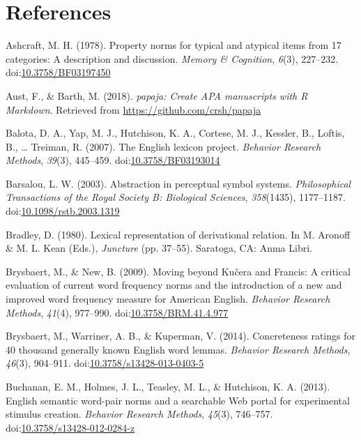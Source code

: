 \documentclass[english,,man]{apa6}
\theoremstyle{definition}
\theoremstyle{definition}
\theoremstyle{definition}
\theoremstyle{remark}
\begin{document}
\newpage

\section{References}\label{references}

\setlength{\parindent}{-0.5in} \setlength{\leftskip}{0.5in}

\hypertarget{refs}{}
\hypertarget{ref-Ashcraft1978a}{}
Ashcraft, M. H. (1978). Property norms for typical and atypical items
from 17 categories: A description and discussion. \emph{Memory \&
Cognition}, \emph{6}(3), 227--232.
doi:\href{https://doi.org/10.3758/BF03197450}{10.3758/BF03197450}

\hypertarget{ref-R-papaja}{}
Aust, F., \& Barth, M. (2018). \emph{papaja: Create APA manuscripts with
R Markdown}. Retrieved from \url{https://github.com/crsh/papaja}

\hypertarget{ref-Balota2007}{}
Balota, D. A., Yap, M. J., Hutchison, K. A., Cortese, M. J., Kessler,
B., Loftis, B., \ldots{} Treiman, R. (2007). The English lexicon
project. \emph{Behavior Research Methods}, \emph{39}(3), 445--459.
doi:\href{https://doi.org/10.3758/BF03193014}{10.3758/BF03193014}

\hypertarget{ref-Barsalou2003}{}
Barsalou, L. W. (2003). Abstraction in perceptual symbol systems.
\emph{Philosophical Transactions of the Royal Society B: Biological
Sciences}, \emph{358}(1435), 1177--1187.
doi:\href{https://doi.org/10.1098/rstb.2003.1319}{10.1098/rstb.2003.1319}

\hypertarget{ref-Bradley1980}{}
Bradley, D. (1980). Lexical representation of derivational relation. In
M. Aronoff \& M. L. Kean (Eds.), \emph{Juncture} (pp. 37--55). Saratoga,
CA: Anma Libri.

\hypertarget{ref-Brysbaert2009}{}
Brysbaert, M., \& New, B. (2009). Moving beyond Kučera and Francis: A
critical evaluation of current word frequency norms and the introduction
of a new and improved word frequency measure for American English.
\emph{Behavior Research Methods}, \emph{41}(4), 977--990.
doi:\href{https://doi.org/10.3758/BRM.41.4.977}{10.3758/BRM.41.4.977}

\hypertarget{ref-Brysbaert2013}{}
Brysbaert, M., Warriner, A. B., \& Kuperman, V. (2014). Concreteness
ratings for 40 thousand generally known English word lemmas.
\emph{Behavior Research Methods}, \emph{46}(3), 904--911.
doi:\href{https://doi.org/10.3758/s13428-013-0403-5}{10.3758/s13428-013-0403-5}

\hypertarget{ref-Buchanan2013}{}
Buchanan, E. M., Holmes, J. L., Teasley, M. L., \& Hutchison, K. A.
(2013). English semantic word-pair norms and a searchable Web portal for
experimental stimulus creation. \emph{Behavior Research Methods},
\emph{45}(3), 746--757.
doi:\href{https://doi.org/10.3758/s13428-012-0284-z}{10.3758/s13428-012-0284-z}
\end{document}
